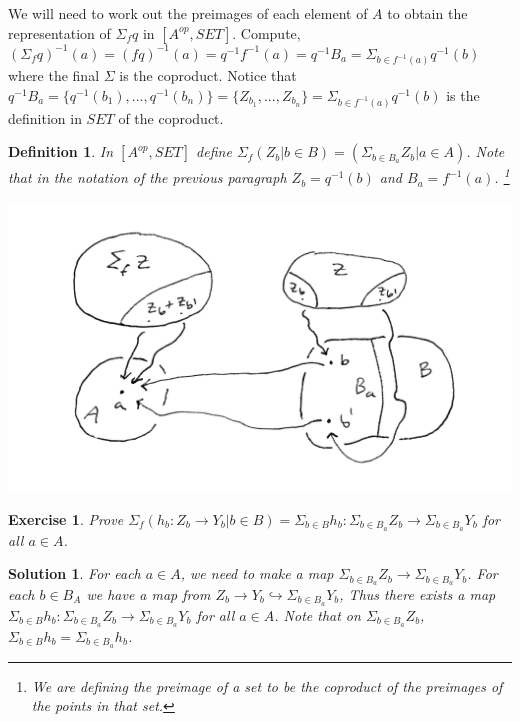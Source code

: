 \documentclass{article}
\theoremstyle{problemstyle}
\theoremstyle{problemstyle}
\newtheorem{definition}{Definition}
\theoremstyle{problemstyle}
\theoremstyle{problemstyle}
\theoremstyle{problemstyle}
\theoremstyle{problemstyle}
\newtheorem{solution}{Solution}
\theoremstyle{problemstyle}
\theoremstyle{problemstyle}
\newtheorem{exercise}{Exercise}
\begin{document}
We will need to work out the preimages of each element of $A$ to obtain the representation of $\Sigma_fq$ in $[A^{op},SET]$. Compute, $(\Sigma_fq)^{-1}(a) = (fq)^{-1}(a) = q^{-1}f^{-1}(a) = q^{-1}B_a = \Sigma_{b\in f^{-1}(a)}q^{-1}(b)$ where the final $\Sigma$ is the coproduct. Notice that $q^{-1}B_a = \{q^{-1}(b_1),...,q^{-1}(b_n)\} = \{Z_{b_1},...,Z_{b_n}\} = \Sigma_{b\in f^{-1}(a)}q^{-1}(b)$ is the definition in $SET$ of the coproduct. 

\begin{definition}
In $[A^{op},SET]$ define $\Sigma_f(Z_b|b\in B) = (\Sigma_{b\in B_a}Z_b|a\in A)$.  Note that in the notation of the previous paragraph $Z_b = q^{-1}(b)$ and $B_a = f^{-1}(a)$. \footnote{We are defining the preimage of a set to be the coproduct of the preimages of the points in that set.} 
\end{definition}

\includegraphics[scale=.1]{Figure3_dependent_sum}

\begin{exercise}
Prove $\Sigma_f(h_b:Z_b \rightarrow Y_b | b \in B) = \Sigma_{b\in B}h_b:\Sigma_{b \in B_a}Z_b \rightarrow \Sigma_{b \in B_a}Y_b$ for all $a \in A$. 
\end{exercise}

\begin{solution}
For each $a \in A$, we need to make a map $\Sigma_{b \in B_a}Z_b \rightarrow \Sigma_{b \in B_a}Y_b$. For each $b \in B_A$ we have a map from $Z_b \rightarrow Y_b \hookrightarrow \Sigma_{b \in B_a}Y_b$, Thus there exists a map $\Sigma_{b\in B}h_b:\Sigma_{b \in B_a}Z_b \rightarrow \Sigma_{b \in B_a}Y_b$ for all $a \in A$. Note that on $\Sigma_{b \in B_a}Z_b$, $\Sigma_{b\in B}h_b = \Sigma_{b\in B_a}h_b$. 
\end{solution}
\end{document}
